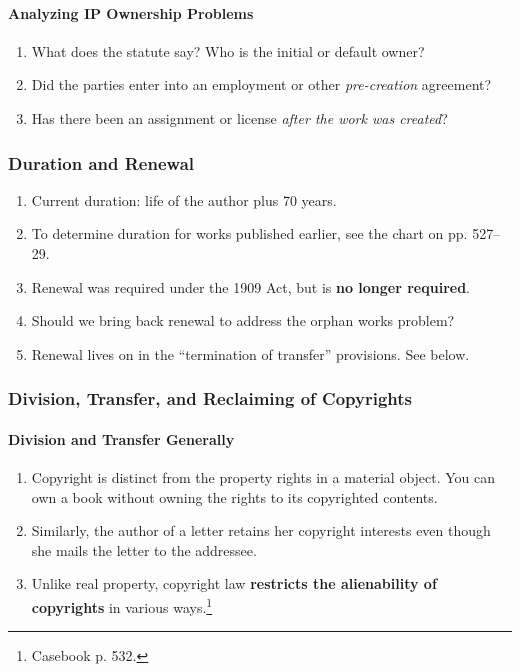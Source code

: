 \paragraph{Analyzing IP Ownership Problems}

\begin{enumerate}
    \item What does the statute say? Who is the initial or default owner?
    \item Did the parties enter into an employment or other 
    \emph{pre-creation} agreement?
    \item Has there been an assignment or license \emph{after the work was 
    created}?
\end{enumerate}

\subsubsection{Duration and Renewal}

\begin{enumerate}
    \item Current duration: life of the author plus 70 years.
    \item To determine duration for works published earlier, see the chart on 
    pp. 527--29.
    \item Renewal was required under the 1909 Act, but is \textbf{no longer 
    required}.
    \item Should we bring back renewal to address the orphan works problem?
    \item Renewal lives on in the ``termination of transfer'' provisions. See 
    below.
\end{enumerate}

\subsubsection{Division, Transfer, and Reclaiming of Copyrights}

\paragraph{Division and Transfer Generally}

\begin{enumerate}
    \item Copyright is distinct from the property rights in a material 
    object. You can own a book without owning the rights to its copyrighted 
    contents.
    \item Similarly, the author of a letter retains her copyright interests 
    even though she mails the letter to the addressee.
    \item Unlike real property, copyright law \textbf{restricts the 
    alienability of copyrights} in various ways.\footnote{Casebook p. 532.}
\end{enumerate}

